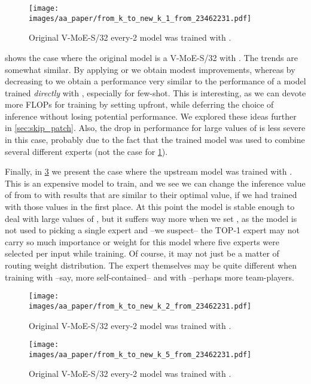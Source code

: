 \documentclass{article}
\newcommand{\abbv}{{V-MoE}}
\begin{document}
\begin{figure}[h]
\centering
\texttt{[image: images/aa\_paper/from\_k\_to\_new\_k\_1\_from\_23462231.pdf]}
\caption{Original V-MoE-S/32 every-2 model was trained with .}
\label{im:from_k_to_new_k_1_full}
\end{figure}

 shows the case where the original model is a \abbv{}-S/32 with .
The trends are somewhat similar.
By applying  or  we obtain modest improvements, whereas by decreasing  to  we obtain a performance very similar to the performance of a model trained \emph{directly} with , especially for few-shot.
This is interesting, as we can devote more FLOPs for training by setting  upfront, while deferring the choice of inference  without losing potential performance.
We explored these ideas further in \cref{sec:skip_patch}.
Also, the drop in performance for large values of  is less severe in this case, probably due to the fact that the trained model was used to combine several different experts (not the case for \cref{im:from_k_to_new_k_1_full}).

Finally, in \cref{im:from_k_to_new_k_5_full} we present the case where the upstream model was trained with .
This is an expensive model to train, and we see we can change the inference value of  from  to  with results that are similar to their optimal value, if we had trained with those values in the first place. At this point the model is stable enough to deal with large values of , but it suffers way more when we set , as the model is not used to picking a single expert and --we suspect-- the TOP-1 expert may not carry so much importance or weight for this model where five experts were selected per input while training.
Of course, it may not just be a matter of routing weight distribution.
The expert themselves may be quite different when training with  --say, more self-contained-- and with  --perhaps more team-players.

\begin{figure}[h]
\centering
\texttt{[image: images/aa\_paper/from\_k\_to\_new\_k\_2\_from\_23462231.pdf]}
\caption{Original V-MoE-S/32 every-2 model was trained with .}
\label{im:from_k_to_new_k_2_full}
\end{figure}

\begin{figure}[h]
\centering
\texttt{[image: images/aa\_paper/from\_k\_to\_new\_k\_5\_from\_23462231.pdf]}
\caption{Original V-MoE-S/32 every-2 model was trained with .}
\label{im:from_k_to_new_k_5_full}
\end{figure}
 
\end{document}
